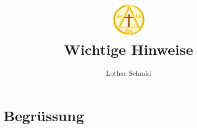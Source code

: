 \documentclass{../inc/mybib}
\title{\includegraphics[height=48pt]{assets/images/logo.png}\\Wichtige Hinweise}
\author{Lothar Schmid}
\begin{document}
\maketitle
\section{Begrüssung}
\end{document}
